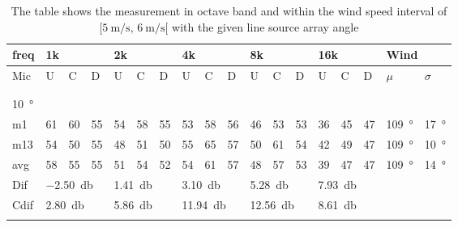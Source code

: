 \begin{table}[H]
\centering
\caption{The table shows the measurement in octave band and within the wind speed interval of $[\SI{5}{\meter\per\second},\, \SI{6}{\meter\per\second}[ $ with the given line source array angle}
\setlength\tabcolsep{5pt} %
\begin{tabular}{l|l|l|l|l|l|l|l|l|l|l|l|l|l|l|l|l|l}
freq & \multicolumn{3}{l|}{1k} & \multicolumn{3}{l|}{2k} & \multicolumn{3}{l|}{4k} & \multicolumn{3}{l|}{8k} & \multicolumn{3}{l|}{16k}   &  \multicolumn{2}{l}{Wind}                      \\ \hline
Mic  & U      & C      & D     & U      & C      & D     & U      & C      & D     & U      & C      & D     & U  & C  & D & $\mu$ & $\sigma$ \\ \hline
 & \multicolumn{3}{l|}{} & \multicolumn{3}{l|}{} & \multicolumn{3}{l|}{} & \multicolumn{3}{l|}{} & \multicolumn{3}{l|}{} &      \multicolumn{2}{l}{}                        \\ 
 \multicolumn{18}{l}{ } \\                             
\SI{10}{\degree}   & \multicolumn{3}{l|}{} & \multicolumn{3}{l|}{} & \multicolumn{3}{l|}{} & \multicolumn{3}{l|}{} & \multicolumn{3}{l|}{}  &  \multicolumn{2}{l}{}  \\  \hline
m1   & 61     &  60    & 55    &  54    &   58   &  55   &  53    &  58    &   56  &  46    &  53    &  53   & 36 & 45 &  47 &  \SI{109}{\degree} & \SI{17}{\degree}  \\ 
m13   &  54    &  50    & 55    & 48     &  51    &  50   &  55    &  65    & 57    & 50     &  61    &  54   & 42 & 49 &  47 & \SI{109}{\degree} & \SI{10}{\degree}   \\ \hline
avg & 58     & 55     & 55   &  51    & 54     &  52   &   54   & 61     &  57   &  48    &  57    & 53    & 39 &47 & 47 & \SI{109}{\degree} & \SI{14}{\degree}   \\ \hline 
Dif & \multicolumn{3}{l|}{\SI{-2.50}{\decibel}} & \multicolumn{3}{l|}{\SI{1.41}{\decibel}} & \multicolumn{3}{l|}{\SI{3.10}{\decibel}} & \multicolumn{3}{l|}{\SI{5.28}{\decibel}} & \multicolumn{3}{l|}{\SI{7.93}{\decibel}}  &   \multicolumn{2}{l}{}   \\ \hline 
Cdif & \multicolumn{3}{l|}{\SI{2.80}{\decibel}} & \multicolumn{3}{l|}{\SI{5.86}{\decibel}} & \multicolumn{3}{l|}{\SI{11.94}{\decibel}} & \multicolumn{3}{l|}{\SI{12.56}{\decibel}} & \multicolumn{3}{l|}{\SI{8.61}{\decibel}}  &   \multicolumn{2}{l}{}   \\ 
 \multicolumn{18}{l}{ } \\                             

\end{tabular}
\end{table}
